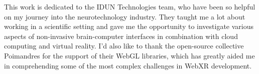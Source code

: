 \begin{dedication}

	This work is dedicated to the IDUN Technologies team, who have been so helpful on my journey into the neurotechnology industry. They taught me a lot about working in a scientific setting and gave me the opportunity to investigate various aspects of non-invasive brain-computer interfaces in combination with cloud computing and virtual reality. I'd also like to thank the open-source collective Poimandres for the support of their WebGL libraries, which has greatly aided me in comprehending some of the most complex challenges in WebXR development.

\end{dedication}